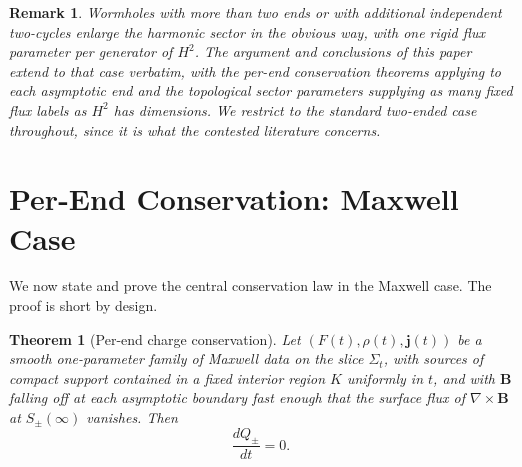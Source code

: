 \documentclass[aps,prd,onecolumn,nofootinbib,superscriptaddress]{revtex4-2}
\newtheorem{theorem}{Theorem}
\newtheorem{remark}{Remark}
\begin{document}
\begin{remark}
Wormholes with more than two ends or with additional independent two-cycles enlarge the harmonic sector in the obvious way, with one rigid flux parameter per generator of $H^2$. The argument and conclusions of this paper extend to that case verbatim, with the per-end conservation theorems applying to each asymptotic end and the topological sector parameters supplying as many fixed flux labels as $H^2$ has dimensions. We restrict to the standard two-ended case throughout, since it is what the contested literature concerns.
\end{remark}

\section{Per-End Conservation: Maxwell Case}
\label{sec:maxwell}

We now state and prove the central conservation law in the Maxwell case. The proof is short by design.

\begin{theorem}[Per-end charge conservation]
\label{thm:Q-conservation}
Let $(F(t),\rho(t),\bm{j}(t))$ be a smooth one-parameter family of Maxwell data on the slice $\Sigma_t$, with sources of compact support contained in a fixed interior region $K$ uniformly in $t$, and with $\bm{B}$ falling off at each asymptotic boundary fast enough that the surface flux of $\nabla\times\bm{B}$ at $S_\pm(\infty)$ vanishes. Then
\begin{equation}
\label{eq:Q-conservation}
\frac{dQ_\pm}{dt} = 0.
\end{equation}
\end{theorem}
\end{document}
